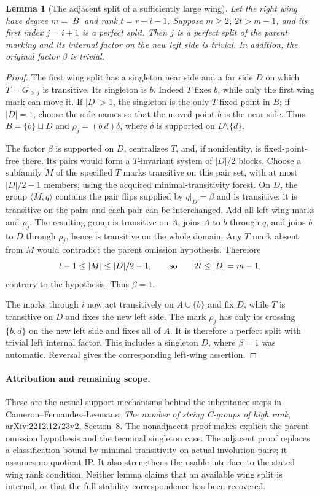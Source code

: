 \documentclass[11pt,a4paper]{article}
\newtheorem{lemma}{Lemma}
\newcommand{\gen}[1]{\langle#1\rangle}
\begin{document}
\begin{lemma}[The adjacent split of a sufficiently large wing]\label{near}
Let the right wing have degree $m=|B|$ and rank $t=r-i-1$.
Suppose $m\ge2$, $2t>m-1$, and its first index $j=i+1$
is a perfect split. Then $j$ is a perfect split of the parent
marking and its internal factor on the new left side is trivial.
In addition, the original factor $\beta$ is trivial.
\end{lemma}
\begin{proof}
The first wing split has a singleton near side and a far
side $D$ on which $T=G_{>j}$ is transitive. Its singleton
is $b$. Indeed $T$ fixes $b$, while only the first wing
mark can move it. If $|D|>1$, the singleton is the only
$T$-fixed point in $B$; if $|D|=1$, choose the side names
so that the moved point $b$ is the near side. Thus
$B=\{b\}\sqcup D$ and $\rho_j=(b\ d)\delta$, where
$\delta$ is supported on $D\setminus\{d\}$.

The factor $\beta$ is supported on $D$, centralizes $T$,
and, if nonidentity, is fixed-point-free there. Its pairs
would form a $T$-invariant system of $|D|/2$ blocks.
Choose a subfamily $M$ of the specified $T$ marks transitive
on this pair set, with at most $|D|/2-1$ members, using the
acquired minimal-transitivity forest. On $D$, the group
$\gen{M,q}$ contains the pair flips supplied by $q|_D=\beta$
and is transitive: it is transitive on the pairs and each
pair can be interchanged. Add all left-wing marks and
$\rho_j$. The resulting group is transitive on $A$, joins
$A$ to $b$ through $q$, and joins $b$ to $D$ through
$\rho_j$, hence is transitive on the whole domain.
Any $T$ mark absent from $M$ would contradict the parent
omission hypothesis. Therefore
\[
 t-1\le |M|\le |D|/2-1,
 \qquad\hbox{so}\qquad 2t\le |D|=m-1,
\]
contrary to the hypothesis. Thus $\beta=1$.

The marks through $i$ now act transitively on $A\cup\{b\}$
and fix $D$, while $T$ is transitive on $D$ and fixes the
new left side. The mark $\rho_j$ has only its crossing
$\{b,d\}$ on the new left side and fixes all of $A$.
It is therefore a perfect split with trivial left internal
factor. This includes a singleton $D$, where $\beta=1$
was automatic. Reversal gives the corresponding left-wing
assertion.
\end{proof}

\paragraph{Attribution and remaining scope.}
These are the actual support mechanisms behind the inheritance
steps in Cameron--Fernandes--Leemans, \emph{The number of string
C-groups of high rank}, arXiv:2212.12723v2, Section~8.
The nonadjacent proof makes explicit the parent omission
hypothesis and the terminal singleton case. The adjacent
proof replaces a classification bound by minimal transitivity
on actual involution pairs; it assumes no quotient IP.
It also strengthens the usable interface to the stated wing
rank condition. Neither lemma claims that an available wing
split is internal, or that the full stability correspondence
has been recovered.
\end{document}
